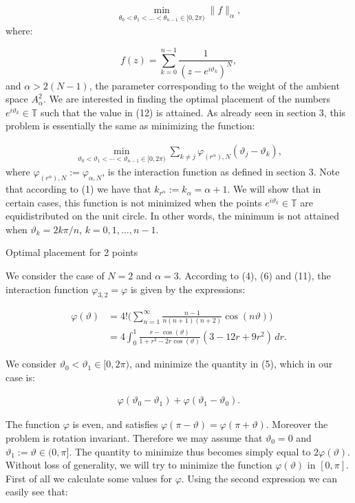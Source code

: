 \documentclass{amsart}[11pt]
\makeatletter
\newcommand{\T}{\mathbb{T}} %
\newcommand{\vphi}{\varphi}
\newcommand{\vth}{\vartheta}
\renewcommand\subsection{\@startsection{subsection}{2}%
\z@{-.5\linespacing\@plus-.7\linespacing}{.5\linespacing}%
{\normalfont\scshape}}
\theoremstyle{definition}
\makeatother
\begin{document}
\begin{gather}
\min_{\theta_0 < \theta_1 < \dots < \theta_{n-1} \in [0,2\pi)} \| f \|_{\alpha},
\end{gather}
where:

\[
f(z) = \sum_{k=0}^{n-1} \frac{1}{(z - e^{i \vth_k})^N},
\]
and $\alpha > 2(N-1)$, the parameter corresponding to the weight of the ambient space $A^2_{\alpha}$. We are interested in finding the optimal placement of the numbers $e^{i \vth_k} \in \T$ such that the value in (12) is attained. As already seen in section 3, this problem is essentially the same as minimizing the function:

\begin{gather}
\min_{\vth_0 < \vth_1 < \cdots < \vth_{n-1} \in [0,2\pi)}\sum_{k \neq j}  \vphi_{(r^\alpha),N}(\vth_j - \vth_k),
\end{gather}
where $\vphi_{(r^{\alpha}),N} := \vphi_{\alpha,N}$, is the interaction function as defined in section 3. Note that according to (1) we have that $k_{r^{\alpha}} := k_{\alpha} = \alpha + 1$. We will show that in certain cases, this function is not minimized when the points $e^{i \vth_k} \in \T$ are equidistributed on the unit circle. In other words, the minimum is not attained when $\vth_k = 2k \pi /n$, $k=0,1,\ldots, n-1$.

\subsection{Optimal placement for 2 points}

We consider the case of $N = 2$ and $\alpha = 3$. According to (4), (6) and (11), the interaction function $\vphi_{3,2} = \vphi$ is given by the expressions:

\begin{align*}
  \vphi(\vth) &= 4!\bigg( \sum_{n=1}^{\infty} \frac{n-1}{n(n+1)(n+2)} \cos(n \vth)  \bigg) \\
   & = 4 \int_0^1 \frac{r - \cos(\vth)}{1 + r^2 - 2r\cos(\vth)} (3 - 12r + 9r^2)\,dr.
\end{align*}

We consider $\vth_0 < \vth_1 \in [0,2\pi)$, and minimize the quantity in (5), which in our case is:

\begin{gather*}
    \vphi(\vth_0 - \vth_1) + \vphi(\vth_1 - \vth_0).
\end{gather*}

 The function $\vphi$ is even, and satisfies $\vphi(\pi - \vth) = \vphi(\pi + \vth)$. Moreover the problem is rotation invariant. Therefore we may assume that $\vth_0 = 0$ and $\vth_1 := \vth \in (0,\pi]$. The quantity to minimize thus becomes simply equal to $2\vphi(\vth)$. Without loss of generality, we will try to minimize the function $\vphi(\vth)$ in $[0,\pi]$. First of all we calculate some values for $\vphi$. Using the second expression  we can easily see that:
\end{document}
